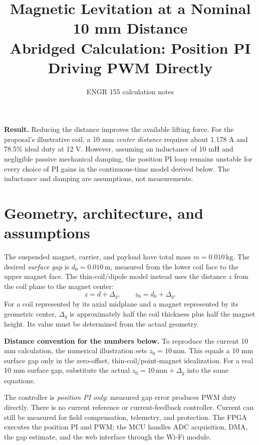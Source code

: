 \documentclass[11pt,letterpaper]{article}
\title{Magnetic Levitation at a Nominal 10 mm Distance\\
\large Abridged Calculation: Position PI Driving PWM Directly}
\author{ENGR 155 calculation notes}
\date{}
\begin{document}
\maketitle
\vspace{-1.5em}

\textbf{Result.} Reducing the distance improves the available lifting force.
For the proposal's illustrative coil, a 10 mm \emph{center distance} requires
about 1.178 A and 78.5\% ideal duty at 12 V. However, assuming an inductance
of 10 mH and negligible passive mechanical damping, the position PI loop
remains unstable for every choice of PI gains in the continuous-time model
derived below. The inductance and damping are assumptions, not measurements.

\section{Geometry, architecture, and assumptions}
The suspended magnet, carrier, and payload have total mass
\(m=0.010\,\mathrm{kg}\). The desired \emph{surface gap} is
\(d_0=0.010\,\mathrm m\), measured from the lower coil face to the upper
magnet face. The thin-coil/dipole model instead uses the distance \(z\)
from the coil plane to the magnet center:
\begin{equation}
 z=d+\Delta_g,\qquad z_0=d_0+\Delta_g.
\end{equation}
For a coil represented by its axial midplane and a magnet represented by its
geometric center, \(\Delta_g\) is approximately half the coil thickness plus
half the magnet height. Its value must be determined from the actual geometry.

\textbf{Distance convention for the numbers below.} To reproduce the current
10 mm calculation, the numerical illustration sets \(z_0=10\,\mathrm{mm}\).
This equals a 10 mm surface gap only in the zero-offset, thin-coil/point-magnet
idealization. For a real 10 mm surface gap, substitute the actual
\(z_0=10\,\mathrm{mm}+\Delta_g\) into the same equations.

The controller is \emph{position PI only}: measured gap error produces PWM
duty directly. There is no current reference or current-feedback controller.
Current can still be measured for field compensation, telemetry, and protection.
The FPGA executes the position PI and PWM; the MCU handles ADC acquisition,
DMA, the gap estimate, and the web interface through the Wi-Fi module.
\end{document}
